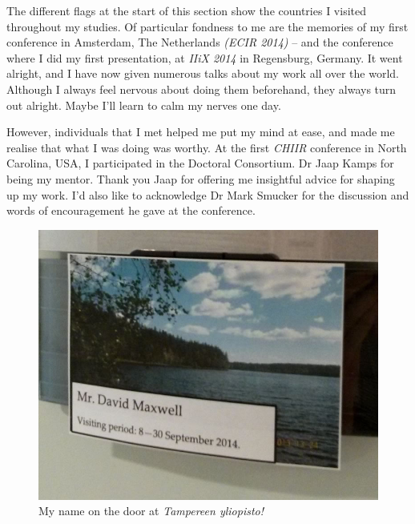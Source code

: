 \begin{preamble}
The different flags at the start of this section show the countries I visited throughout my studies. Of particular fondness to me are the memories of my first conference in Amsterdam, The Netherlands \emph{(ECIR 2014)} -- and the conference where I did my first presentation, at \emph{IIiX 2014} in Regensburg, Germany. It went alright, and I have now given numerous talks about my work all over the world. Although I always feel nervous about doing them beforehand, they always turn out alright. Maybe I'll learn to calm my nerves one day.

However, individuals that I met helped me put my mind at ease, and made me realise that what I was doing was worthy. At the first \emph{CHIIR} conference in North Carolina, USA, I participated in the Doctoral Consortium. Dr Jaap Kamps for being my mentor. Thank you Jaap for offering me insightful advice for shaping up my work. I'd also like to acknowledge Dr Mark Smucker for the discussion and words of encouragement he gave at the conference.

\renewcommand{\figurename}{Picture}
\begin{figure}
    \begin{center}
    \vspace*{-9mm}
    \includegraphics[width=1\textwidth]{figures/ch0-tampere.jpg}
    \end{center}
    \vspace*{-6mm}
    \caption[]{My name on the door at \emph{Tampereen yliopisto!}}
    \label{fig:acks_finland}
\end{figure}
\renewcommand{\figurename}{Figure}


\end{preamble}

